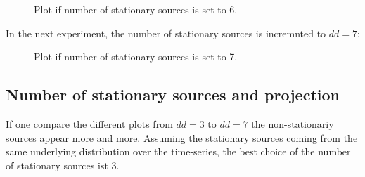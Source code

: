 \documentclass[a4paper, 12pt, titlepage]{article}
\begin{document}
\begin{figure}[H]
	\centering
	\caption{ Plot if number of stationary sources is set to 6.}
\end{figure}


In the next experiment, the number of stationary sources is incremnted to $dd=7$:


\begin{figure}[H]
	\centering
	\caption{ Plot if number of stationary sources is set to 7.}
\end{figure}


\subsection{Number of stationary sources and projection}
If one compare the different plots from $dd=3$ to $dd=7$ the non-stationariy sources appear more and more.
Assuming the stationary sources coming from the same underlying distribution over the time-series, the best choice of the number of stationary sources ist 3.
\newline \newline
\end{document}
